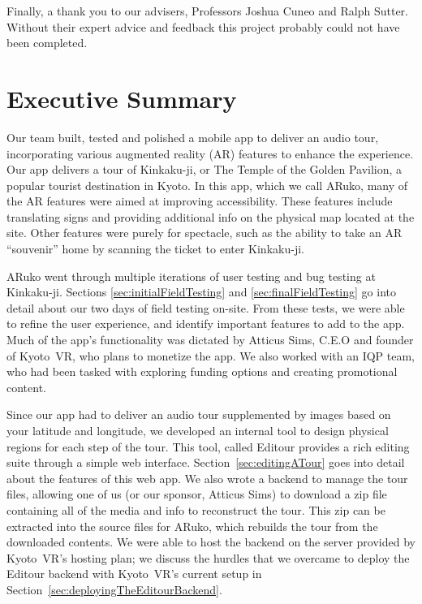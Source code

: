 \documentclass[a4paper, 10pt, american, titlepage]{article}
\begin{document}
Finally, a thank you to our advisers, Professors Joshua Cuneo and Ralph Sutter.
Without their expert advice and feedback this project probably could not have
been completed.

\clearpage

\section*{Executive Summary}
\label{sec:executiveSummary}

Our team built, tested and polished a mobile app to deliver an audio tour,
incorporating various augmented reality (AR) features to enhance the
experience. Our app delivers a tour of Kinkaku-ji, or The Temple of the Golden
Pavilion, a popular tourist destination in Kyoto. In this app, which we call
ARuko, many of the AR features were aimed at improving accessibility. These
features include translating signs and providing additional info on the
physical map located at the site. Other features were purely for spectacle,
such as the ability to take an AR ``souvenir'' home by scanning the ticket
to enter Kinkaku-ji.

ARuko went through multiple iterations of user testing and bug testing at
Kinkaku-ji. Sections \ref{sec:initialFieldTesting} and
\ref{sec:finalFieldTesting} go into detail about our two days of field testing
on-site. From these tests, we were able to refine the user experience, and
identify important features to add to the app. Much of the app's functionality
was dictated by Atticus Sims, C.E.O and founder of Kyoto~VR, who plans to
monetize the app. We also worked with an IQP team, who had been tasked with
exploring funding options and creating promotional content.

Since our app had to deliver an audio tour supplemented by images based on your
latitude and longitude, we developed an internal tool to design physical
regions for each step of the tour. This tool, called Editour provides a rich
editing suite through a simple web interface. Section~\ref{sec:editingATour}
goes into detail about the features of this web app. We also wrote a backend to
manage the tour files, allowing one of us (or our sponsor, Atticus Sims) to
download a zip file containing all of the media and info to reconstruct the
tour. This zip can be extracted into the source files for ARuko, which rebuilds
the tour from the downloaded contents. We were able to host the backend on the
server provided by Kyoto~VR's hosting plan; we discuss the hurdles that we
overcame to deploy the Editour backend with Kyoto~VR's current setup in
Section~\ref{sec:deployingTheEditourBackend}.
\end{document}
